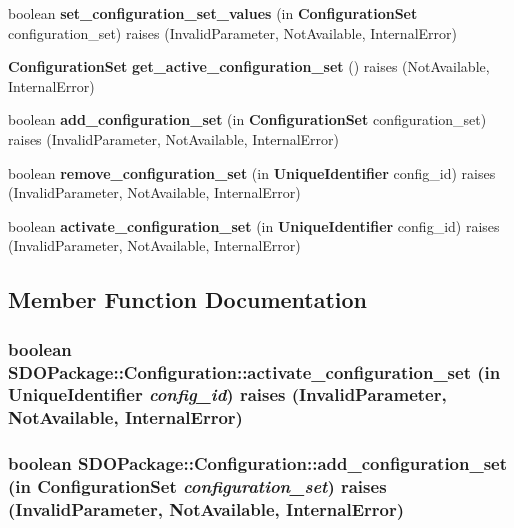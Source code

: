 \begin{DoxyCompactItemize}
\item 
boolean {\bf set\_\-configuration\_\-set\_\-values} (in {\bf ConfigurationSet} configuration\_\-set)  raises (InvalidParameter, NotAvailable, InternalError)
\item 
{\bf ConfigurationSet} {\bf get\_\-active\_\-configuration\_\-set} ()  raises (NotAvailable, InternalError)
\item 
boolean {\bf add\_\-configuration\_\-set} (in {\bf ConfigurationSet} configuration\_\-set)  raises (InvalidParameter, NotAvailable, InternalError)
\item 
boolean {\bf remove\_\-configuration\_\-set} (in {\bf UniqueIdentifier} config\_\-id)  raises (InvalidParameter, NotAvailable, InternalError)
\item 
boolean {\bf activate\_\-configuration\_\-set} (in {\bf UniqueIdentifier} config\_\-id)  raises (InvalidParameter, NotAvailable, InternalError)
\end{DoxyCompactItemize}


\subsection{Member Function Documentation}
\subsubsection[{activate\_\-configuration\_\-set}]{\setlength{\rightskip}{0pt plus 5cm}boolean SDOPackage::Configuration::activate\_\-configuration\_\-set (in {\bf UniqueIdentifier} {\em config\_\-id})  raises (InvalidParameter, NotAvailable, InternalError)}\label{interfaceSDOPackage_1_1Configuration_a328e38e1fa5acd4fb27b1a99912a4923}
\subsubsection[{add\_\-configuration\_\-set}]{\setlength{\rightskip}{0pt plus 5cm}boolean SDOPackage::Configuration::add\_\-configuration\_\-set (in {\bf ConfigurationSet} {\em configuration\_\-set})  raises (InvalidParameter, NotAvailable, InternalError)}\label{interfaceSDOPackage_1_1Configuration_a04a066acc0585d940c058a6fc34f5023}
